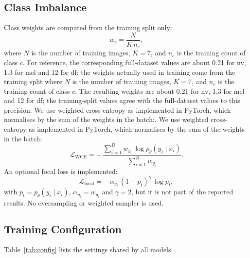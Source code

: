 \documentclass[conference]{IEEEtran}
\begin{document}
\subsection{Class Imbalance}
Class weights are computed from the training split only:
\begin{equation}
w_c = \frac{N}{K\,n_c},
\end{equation}
where $N$ is the number of training images, $K=7$, and $n_c$ is the training count of class $c$. For reference, the corresponding full-dataset values are about 0.21 for nv, 1.3 for mel and 12 for df; the weights actually used in training come from the training split where $N$ is the number of training images, $K=7$, and $n_c$ is the training count of class $c$. The resulting weights are about 0.21 for nv, 1.3 for mel and 12 for df; the training-split values agree with the full-dataset values to this precision. We use weighted cross-entropy as implemented in PyTorch, which normalises by the sum of the weights in the batch:. We use weighted cross-entropy as implemented in PyTorch, which normalises by the sum of the weights in the batch:
\begin{equation}
\mathcal{L}_{\mathrm{WCE}} = -\,\frac{\sum_{i=1}^{B} w_{y_i}\,\log p_\theta(y_i\mid x_i)}{\sum_{i=1}^{B} w_{y_i}}.
\end{equation}
An optional focal loss is implemented:
\begin{equation}
\mathcal{L}_{\mathrm{focal}} = -\,\alpha_{y_i}\,(1-p_t)^{\gamma}\,\log p_t,
\end{equation}
with $p_t = p_\theta(y_i\mid x_i)$, $\alpha_{y_i}=w_{y_i}$ and $\gamma=2$, but it is not part of the reported results. No oversampling or weighted sampler is used.

\subsection{Training Configuration}
Table~\ref{tab:config} lists the settings shared by all models.
\end{document}
